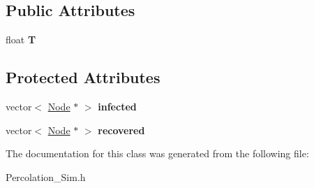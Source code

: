 \subsection*{Public Attributes}
\begin{DoxyCompactItemize}
\item 
\hypertarget{classPercolation__Sim_a49395f0bb8d201ba759cc8283ca92595}{}float {\bfseries T}\label{classPercolation__Sim_a49395f0bb8d201ba759cc8283ca92595}

\end{DoxyCompactItemize}
\subsection*{Protected Attributes}
\begin{DoxyCompactItemize}
\item 
\hypertarget{classPercolation__Sim_a2d1e8339487c926fc6f1ae4ca6c70e81}{}vector$<$ \hyperlink{classNode}{Node} $\ast$ $>$ {\bfseries infected}\label{classPercolation__Sim_a2d1e8339487c926fc6f1ae4ca6c70e81}

\item 
\hypertarget{classPercolation__Sim_a493e6dfe3ee61cf8715724d2eb1d0437}{}vector$<$ \hyperlink{classNode}{Node} $\ast$ $>$ {\bfseries recovered}\label{classPercolation__Sim_a493e6dfe3ee61cf8715724d2eb1d0437}

\end{DoxyCompactItemize}


The documentation for this class was generated from the following file\+:\begin{DoxyCompactItemize}
\item 
Percolation\+\_\+\+Sim.\+h\end{DoxyCompactItemize}
